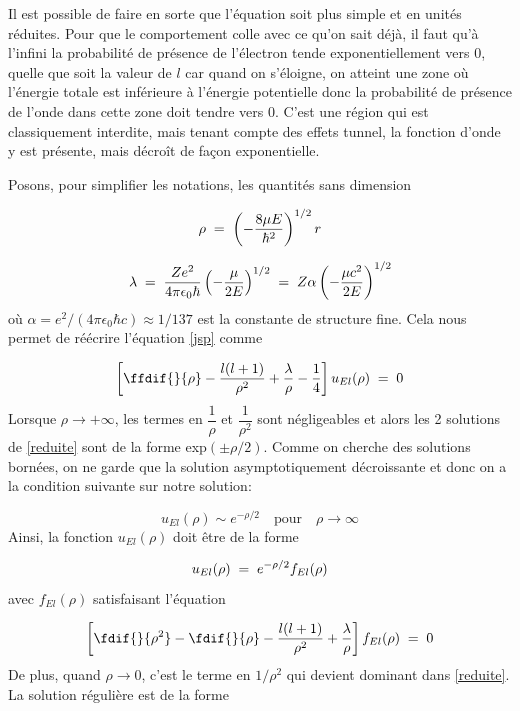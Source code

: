 Il est possible de faire en sorte que l'équation soit plus simple et en unités réduites. Pour que le comportement colle avec ce qu'on sait déjà, il faut qu'à l'infini la probabilité de présence de l'électron tende exponentiellement vers 0, quelle que soit la valeur de $l$ car quand on s'éloigne, on atteint une zone où l'énergie totale est inférieure à l'énergie potentielle donc la probabilité de présence de l'onde dans cette zone doit tendre vers 0. C'est une région qui est classiquement interdite, mais tenant compte des effets tunnel, la fonction d'onde y est présente, mais décroît de façon exponentielle.


Posons, pour simplifier les notations, les quantités sans dimension

\[
    \rho\; = \;\left(-\dfrac{8\mu E}{\hbar^2}\right)^{1/2}r
\]

\begin{equation}
    \lambda\; = \;\dfrac{Ze^2}{4\pi\epsilon_0 \hbar}\left(-\dfrac{\mu}{2E}\right)^{1/2}\; = \; Z\alpha\left(-\dfrac{\mu c^2}{2E}\right)^{1/2}
    \label{lambda}
\end{equation}
où $\alpha=e^2/(4\pi\epsilon_0 \hbar c) \approx 1/137$ est la constante de structure fine. Cela nous permet de réécrire l'équation \eqref{jsp} comme


\begin{equation}
    \left[\ffdif{}{\rho}-\dfrac{l(l+1)}{\rho^2}+\dfrac{\lambda}{\rho}-\dfrac{1}{4}\right]u_{El}(\rho)\eq0
    \label{reduite}
\end{equation}
Lorsque $\rho \rightarrow +\infty$, les termes en $\dfrac{1}{\rho}$ et $\dfrac{1}{\rho^2}$ sont négligeables et alors les 2 solutions de \eqref{reduite} sont de la forme exp$(\pm \rho/2)$. Comme on cherche des solutions bornées, on ne garde que la solution asymptotiquement décroissante et donc on a la condition suivante sur notre solution:

\[
    u_{El}(\rho)\sim e^{-\rho/2} \quad \text{pour} \quad \rho \longrightarrow \infty
\]
Ainsi, la fonction $u_{El}(\rho)$ doit être de la forme

\[
    u_{El}(\rho)\; = \; e^{-\rho/2}f_{El}(\rho)
\]
avec $f_{El}(\rho)$ satisfaisant l'équation

\begin{equation}
    \left[\fdif{}{\rho^2}-\fdif{}{\rho}-\dfrac{l(l+1)}{\rho^2}+\dfrac{\lambda}{\rho}\right]f_{El}(\rho)\eq0
    \label{fel}
\end{equation}
De plus, quand $\rho \longrightarrow 0$, c'est le terme en $1/\rho^2$ qui devient dominant dans \eqref{reduite}. La solution régulière est de la forme


